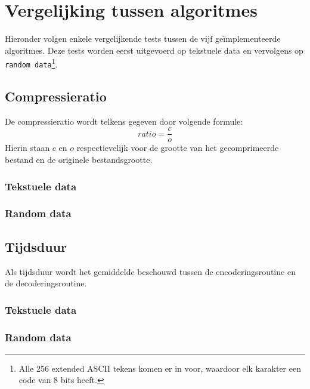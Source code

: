 \chapter{Vergelijking tussen algoritmes}
Hieronder volgen enkele vergelijkende tests tussen de vijf ge\"implementeerde algoritmes. Deze tests worden eerst uitgevoerd op tekstuele data en vervolgens op \texttt{random data}\footnote{Alle 256 extended ASCII tekens komen er in voor, waardoor elk karakter een code van 8 bits heeft.}.

\section{Compressieratio}
De compressieratio wordt telkens gegeven door volgende formule:
$$ratio = \frac{c}{o}$$
Hierin staan $c$ en $o$ respectievelijk voor de grootte van het gecomprimeerde bestand en de originele bestandsgrootte.

\subsection{Tekstuele data}

\subsection{Random data}

\section{Tijdsduur}
Als tijdsduur wordt het gemiddelde beschouwd tussen de encoderingsroutine en de decoderingsroutine.

\subsection{Tekstuele data}

\subsection{Random data}